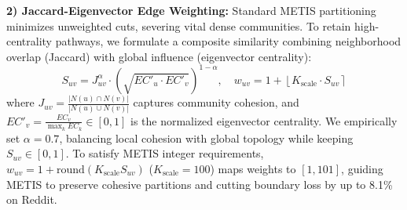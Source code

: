 \textbf{2) Jaccard-Eigenvector Edge Weighting:}
Standard METIS partitioning minimizes unweighted cuts, severing vital dense communities. To retain high-centrality pathways, we formulate a composite similarity combining neighborhood overlap (Jaccard) with global influence (eigenvector centrality):
{\setlength{\abovedisplayskip}{2pt}\setlength{\belowdisplayskip}{2pt}
\begin{equation} \label{eq:weight}
S_{uv} = J_{uv}^\alpha \cdot \left(\sqrt{EC'_u \cdot EC'_v}\right)^{1-\alpha}, \quad w_{uv} = 1 + \left\lfloor K_{\text{scale}} \cdot S_{uv} \right\rceil
\end{equation}}
where $J_{uv} = \frac{|N(u) \cap N(v)|}{|N(u) \cup N(v)|}$ captures community cohesion, and $EC'_v = \frac{EC_v}{\max_{k} EC_k} \in [0, 1]$ is the normalized eigenvector centrality. We empirically set $\alpha = 0.7$, balancing local cohesion with global topology while keeping $S_{uv} \in [0, 1]$. To satisfy METIS integer requirements, $w_{uv} = 1 + \text{round}(K_{\text{scale}} S_{uv})$ ($K_{\text{scale}} = 100$) maps weights to $[1, 101]$, guiding METIS to preserve cohesive partitions and cutting boundary loss by up to 8.1\% on Reddit.


